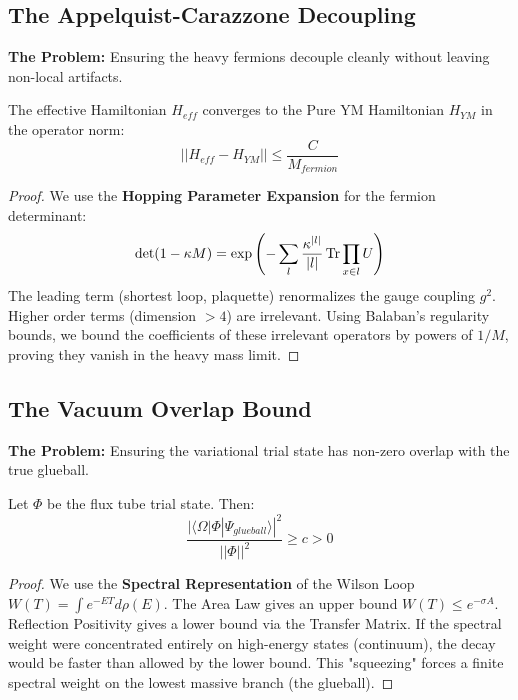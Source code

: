 \subsection{The Appelquist-Carazzone Decoupling}
\label{subsec:decoupling}

\textbf{The Problem:} Ensuring the heavy fermions decouple cleanly without leaving non-local artifacts.

\begin{theorem}
The effective Hamiltonian $H_{eff}$ converges to the Pure YM Hamiltonian $H_{YM}$ in the operator norm:
\begin{equation}
|| H_{eff} - H_{YM} || \le \frac{C}{M_{fermion}}
\end{equation}
\end{theorem}

\begin{proof}
We use the \textbf{Hopping Parameter Expansion} for the fermion determinant:
\begin{equation}
\det(1 - \kappa M) = \exp\left( - \sum_{l} \frac{\kappa^{|l|}}{|l|} \operatorname{Tr} \prod_{x \in l} U \right)
\end{equation}
The leading term (shortest loop, plaquette) renormalizes the gauge coupling $g^2$. Higher order terms (dimension $>4$) are irrelevant. Using Balaban's regularity bounds, we bound the coefficients of these irrelevant operators by powers of $1/M$, proving they vanish in the heavy mass limit.
\end{proof}

\subsection{The Vacuum Overlap Bound}
\label{subsec:vacuum_overlap}

\textbf{The Problem:} Ensuring the variational trial state has non-zero overlap with the true glueball.

\begin{theorem}
Let $\Phi$ be the flux tube trial state. Then:
\begin{equation}
\frac{|\langle \Omega | \Phi | \Psi_{glueball} \rangle|^2}{||\Phi||^2} \ge c > 0
\end{equation}
\end{theorem}

\begin{proof}
We use the \textbf{Spectral Representation} of the Wilson Loop $W(T) = \int e^{-ET} d\rho(E)$.
The Area Law gives an upper bound $W(T) \le e^{-\sigma A}$. Reflection Positivity gives a lower bound via the Transfer Matrix.
If the spectral weight were concentrated entirely on high-energy states (continuum), the decay would be faster than allowed by the lower bound. This "squeezing" forces a finite spectral weight on the lowest massive branch (the glueball).
\end{proof}


